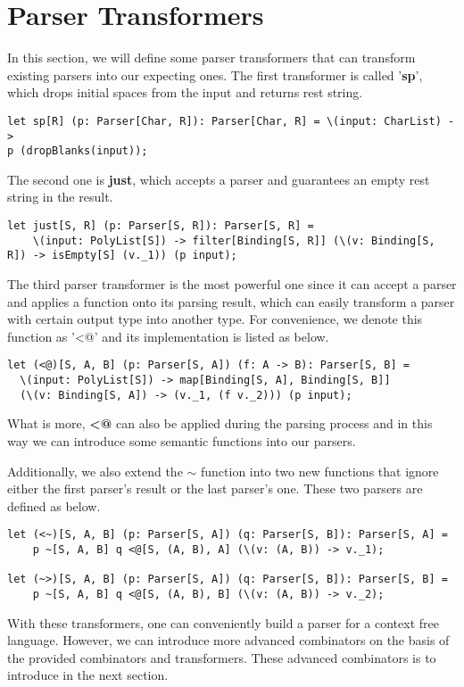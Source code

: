 \section{Parser Transformers}
In this section, we will define some parser transformers that can transform existing parsers into our expecting ones. The first transformer is called '\textbf{sp}', which drops initial spaces from the input and returns rest string.
\begin{lstlisting}
let sp[R] (p: Parser[Char, R]): Parser[Char, R] = \(input: CharList) -> 
p (dropBlanks(input));
\end{lstlisting}
The second one is \textbf{just}, which accepts a parser and guarantees an empty rest string in the result.
\begin{lstlisting}
let just[S, R] (p: Parser[S, R]): Parser[S, R] =
    \(input: PolyList[S]) -> filter[Binding[S, R]] (\(v: Binding[S, R]) -> isEmpty[S] (v._1)) (p input);
\end{lstlisting}
The third parser transformer is the most powerful one since it can accept a parser and applies a function onto its parsing result, which can easily transform a parser with certain output type into another type. For convenience, we denote this function as '<@' and its implementation is listed as below.
\begin{lstlisting}
let (<@)[S, A, B] (p: Parser[S, A]) (f: A -> B): Parser[S, B] =
  \(input: PolyList[S]) -> map[Binding[S, A], Binding[S, B]] 
  (\(v: Binding[S, A]) -> (v._1, (f v._2))) (p input);
\end{lstlisting}
What is more, \textbf{<@} can also be applied during the parsing process and in this way we can introduce some semantic functions into our parsers.

Additionally, we also extend the \textbf{$\sim$} function into two new functions that ignore either the first parser's result or the last parser's one. These two parsers are defined as below.
\begin{lstlisting}
let (<~)[S, A, B] (p: Parser[S, A]) (q: Parser[S, B]): Parser[S, A] =
	p ~[S, A, B] q <@[S, (A, B), A] (\(v: (A, B)) -> v._1);
	
let (~>)[S, A, B] (p: Parser[S, A]) (q: Parser[S, B]): Parser[S, B] =
	p ~[S, A, B] q <@[S, (A, B), B] (\(v: (A, B)) -> v._2);
\end{lstlisting}
With these transformers, one can conveniently build a parser for a context free language. However, we can introduce more advanced combinators on the basis of the provided combinators and transformers. These advanced combinators is to introduce in the next section.

